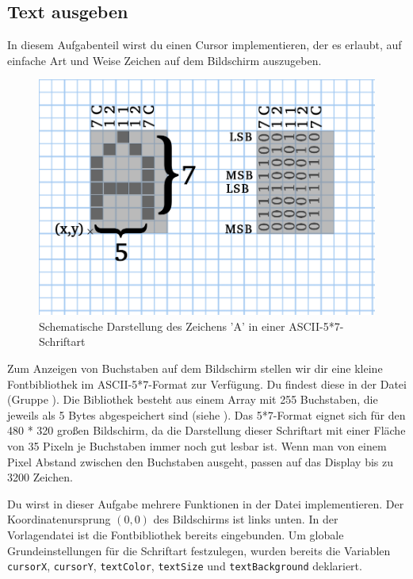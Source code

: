 \subsection{Text ausgeben}
In diesem Aufgabenteil wirst du einen Cursor implementieren, der es erlaubt, auf einfache Art und Weise Zeichen auf dem Bildschirm auszugeben.
%
\begin{figure}[!htb]
	\begin{centering}
		\includegraphics[width=.5\textwidth]{./05_c/figures/ASCII57.png}
		\caption{Schematische Darstellung des Zeichens 'A' in einer ASCII-5*7-Schriftart}
		\label{fig:ascii57}
	\end{centering}
\end{figure}
%
Zum Anzeigen von Buchstaben auf dem Bildschirm stellen wir dir eine kleine Fontbibliothek im ASCII-5*7-Format zur Verfügung.
Du findest diese in der Datei  (Gruppe ).
Die Bibliothek besteht aus einem Array mit 255 Buchstaben, die jeweils als 5 Bytes abgespeichert sind (siehe ).
Das 5*7-Format eignet sich für den 480 * 320 großen Bildschirm, da die Darstellung dieser Schriftart mit einer Fläche von 35 Pixeln je Buchstaben immer noch gut lesbar ist.
Wenn man von einem Pixel Abstand zwischen den Buchstaben ausgeht, passen auf das Display bis zu 3200 Zeichen.

Du wirst in dieser Aufgabe mehrere Funktionen in der Datei  implementieren.
Der Koordinatenursprung $(0,0)$ des Bildschirms ist links unten.
In der Vorlagendatei  ist die Fontbibliothek  bereits eingebunden.
Um globale Grundeinstellungen für die Schriftart festzulegen, wurden bereits die Variablen \lstinline|cursorX|, \lstinline|cursorY|, \lstinline|textColor|, \lstinline|textSize| und \lstinline|textBackground| deklariert. 


